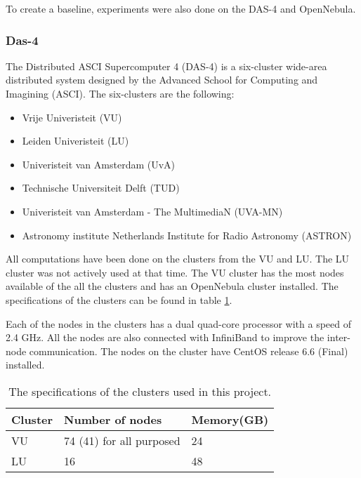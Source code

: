 To create a baseline, experiments were also done on the DAS-4 and OpenNebula.
\subsubsection{Das-4}
\label{hw:das4}
The Distributed ASCI Supercomputer 4 (DAS-4) is a six-cluster wide-area distributed system designed by the Advanced School for Computing and Imagining (ASCI)\cite{das-4}. The six-clusters are the following:
\begin{itemize}
\item Vrije Univeristeit (VU)
\item Leiden Univeristeit (LU)
\item Univeristeit van Amsterdam (UvA) 
\item Technische Universiteit Delft (TUD)
\item Univeristeit van Amsterdam - The MultimediaN (UVA-MN) 
\item Astronomy institute Netherlands Institute for Radio Astronomy (ASTRON)
\end{itemize}
All computations have been done on the clusters from the VU and LU. The LU cluster was not actively used at that time. The VU cluster has the most nodes available of the all the clusters and has an OpenNebula cluster installed. The specifications of the clusters can be found in table \ref{tab:das-clusters}. 

Each of the nodes in the clusters has a dual quad-core processor with a speed of 2.4 GHz. All the nodes are also connected with InfiniBand\cite{infiniband} to improve the inter-node communication. The nodes on the cluster have CentOS release 6.6 (Final) installed.
\begin{table}[!h]
	\begin{center}
\begin{tabular}{|l|l|l|}
\hline
Cluster & Number of nodes  & Memory(GB) \\ \hline
VU 		& 74 (41) for all purposed	 & 24			\\ \hline
LU		& 16 & 48 \\ \hline
\end{tabular}
\end{center}
\caption{The specifications of the clusters used in this project.}
\label{tab:das-clusters}
\end{table}

